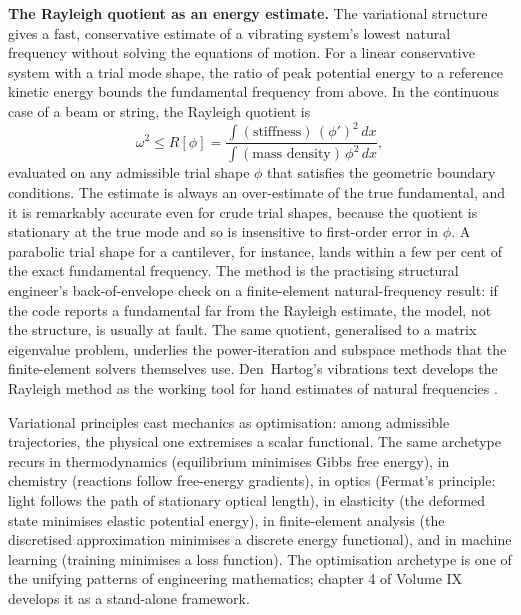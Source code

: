 \begin{mastery}
\textbf{The Rayleigh quotient as an energy estimate.} The variational
structure gives a fast, conservative estimate of a vibrating system's
lowest natural frequency without solving the equations of motion. For a
linear conservative system with a trial mode shape, the ratio of peak
potential energy to a reference kinetic energy bounds the fundamental
frequency from above. In the continuous case of a beam or string, the
Rayleigh quotient is
\[
\omega^2 \le R[\phi]
= \frac{\displaystyle\int (\text{stiffness})\,(\phi')^2\,dx}
       {\displaystyle\int (\text{mass density})\,\phi^2\,dx},
\]
evaluated on any admissible trial shape $\phi$ that satisfies the
geometric boundary conditions. The estimate is always an over-estimate
of the true fundamental, and it is remarkably accurate even for crude
trial shapes, because the quotient is stationary at the true mode and
so is insensitive to first-order error in $\phi$. A parabolic trial
shape for a cantilever, for instance, lands within a few per cent of
the exact fundamental frequency. The method is the practising
structural engineer's back-of-envelope check on a finite-element
natural-frequency result: if the code reports a fundamental far from the
Rayleigh estimate, the model, not the structure, is usually at fault.
The same quotient, generalised to a matrix eigenvalue problem,
underlies the power-iteration and subspace methods that the
finite-element solvers themselves use. Den~Hartog's vibrations text
develops the Rayleigh method as the working tool for hand estimates of
natural frequencies \cite{text:den-hartog-vibrations}.
\end{mastery}

\begin{archetype}[Optimisation]
Variational principles cast mechanics as optimisation: among
admissible trajectories, the physical one extremises a scalar
functional. The same archetype recurs in thermodynamics (equilibrium
minimises Gibbs free energy), in chemistry (reactions follow
free-energy gradients), in optics (Fermat's principle: light follows
the path of stationary optical length), in elasticity (the deformed
state minimises elastic potential energy), in finite-element
analysis (the discretised approximation minimises a discrete energy
functional), and in machine learning (training minimises a loss
function). The optimisation archetype is one of the unifying
patterns of engineering mathematics; chapter 4 of Volume IX develops
it as a stand-alone framework.
\end{archetype}

